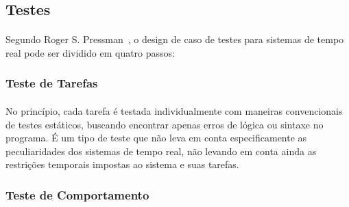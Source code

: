 %

\subsection{Testes}
\paragraph{}
Segundo Roger S. Pressman~\cite{pre_2005}, o design de caso de testes para sistemas de tempo real pode ser dividido
em quatro passos:

\subsubsection{Teste de Tarefas}
\paragraph{}
No princípio, cada tarefa é testada individualmente com maneiras convencionais de testes estáticos, buscando encontrar
apenas erros de lógica ou sintaxe no programa. É um tipo de teste que não leva em conta especificamente as peculiaridades
dos sistemas de tempo real, não levando em conta ainda as restrições temporais impostas ao sistema e suas tarefas.

\subsubsection{Teste de Comportamento}
